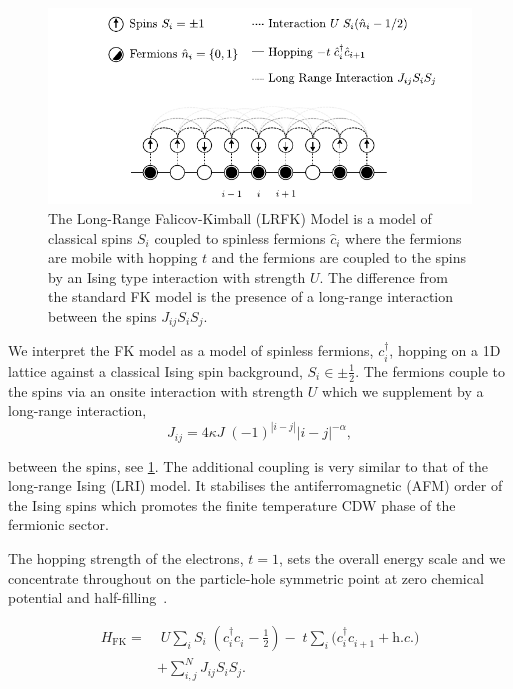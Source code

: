 \hypertarget{fig:lrfk_schematic}{%
\begin{figure}
\centering
\includegraphics[width=1\textwidth,height=\textheight]{figure_code/intro_chapter/lrfk_schematic}
\caption[{Falicov-Kimball Model Diagram}]{The Long-Range Falicov-Kimball (LRFK) Model is a model of classical spins \(S_i\) coupled to spinless fermions \(\hat{c}_i\) where the fermions are mobile with hopping \(t\) and the fermions are coupled to the spins by an Ising type interaction with strength \(U\). The difference from the standard FK model is the presence of a long-range interaction between the spins \(J_{ij}S_i S_j\).}
\label{fig:lrfk_schematic}
\end{figure}
}

We interpret the FK model as a model of spinless fermions, \(c^\dagger_{i}\), hopping on a 1D lattice against a classical Ising spin background, \(S_i \in {\pm \frac{1}{2}}\). The fermions couple to the spins via an onsite interaction with strength \(U\) which we supplement by a long-range interaction, \[
J_{ij} = 4\kappa J\; (-1)^{|i-j|} |i-j|^{-\alpha},
\]

between the spins, see \cref{fig:lrfk_schematic}. The additional coupling is very similar to that of the long-range Ising (LRI) model. It stabilises the antiferromagnetic (AFM) order of the Ising spins which promotes the finite temperature CDW phase of the fermionic sector.

The hopping strength of the electrons, \(t = 1\), sets the overall energy scale and we concentrate throughout on the particle-hole symmetric point at zero chemical potential and half-filling~\autocite{gruberFalicovKimballModelReview1996}.

\[\begin{aligned}
H_{\mathrm{FK}} = & \;U \sum_{i} S_i\;(c^\dagger_{i}c^{\phantom{\dagger}}_{i} - \tfrac{1}{2}) -\;t \sum_{i} (c^\dagger_{i}c^{\phantom{\dagger}}_{i+1} + \textit{h.c.)}\\ 
 &  + \sum_{i, j}^{N} J_{ij}  S_i S_j.
\label{eq:HFK}\end{aligned}\]

